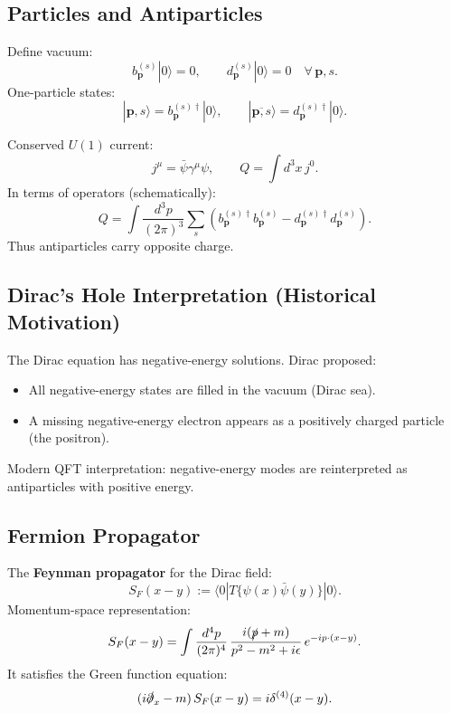 \subsection{Particles and Antiparticles}
Define vacuum:
\begin{equation}
b_{\mathbf{p}}^{(s)}|0\rangle=0,
\qquad
d_{\mathbf{p}}^{(s)}|0\rangle=0
\quad \forall\,\mathbf{p},s.
\end{equation}
One-particle states:
\begin{equation}
|\mathbf{p},s\rangle = b_{\mathbf{p}}^{(s)\dagger}|0\rangle,
\qquad
|\overline{\mathbf{p},s}\rangle = d_{\mathbf{p}}^{(s)\dagger}|0\rangle.
\end{equation}

Conserved $U(1)$ current:
\begin{equation}
j^\mu=\bar{\psi}\gamma^\mu\psi,
\qquad
Q=\int d^3x\,j^0.
\end{equation}
In terms of operators (schematically):
\begin{equation}
Q=\int\frac{d^3p}{(2\pi)^3}\sum_s
\left(
b_{\mathbf{p}}^{(s)\dagger}b_{\mathbf{p}}^{(s)}
-
d_{\mathbf{p}}^{(s)\dagger}d_{\mathbf{p}}^{(s)}
\right).
\end{equation}
Thus antiparticles carry opposite charge.

\subsection{Dirac's Hole Interpretation (Historical Motivation)}
The Dirac equation has negative-energy solutions. Dirac proposed:
\begin{itemize}
\item All negative-energy states are filled in the vacuum (Dirac sea).
\item A missing negative-energy electron appears as a positively charged particle (the positron).
\end{itemize}
Modern QFT interpretation: negative-energy modes are reinterpreted as antiparticles with positive energy.

\subsection{Fermion Propagator}
The \textbf{Feynman propagator} for the Dirac field:
\begin{equation}
S_F(x-y)
:=
\langle 0|T\{\psi(x)\bar{\psi}(y)\}|0\rangle.
\end{equation}
Momentum-space representation:
\begin{equation}
S_F(x-y)
=
\int\frac{d^4p}{(2\pi)^4}\,
\frac{i(\slashed{p}+m)}{p^2-m^2+i\epsilon}\,e^{-ip\cdot(x-y)}.
\end{equation}
It satisfies the Green function equation:
\begin{equation}
(i\slashed{\partial}_x-m)\,S_F(x-y)=i\delta^{(4)}(x-y).
\end{equation}

